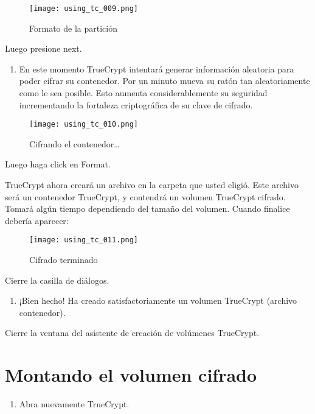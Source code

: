 \documentclass[10pt,a5paper,twoside,,]{book}
\providecommand{\tightlist}{%
  \setlength{\itemsep}{0pt}\setlength{\parskip}{0pt}}
\begin{document}
\begin{figure}[htbp]
\centering
\texttt{[image: using\_tc\_009.png]}
\caption{Formato de la partición}
\end{figure}

Luego presione next.

\begin{enumerate}
\def\labelenumi{\arabic{enumi}.}
\setcounter{enumi}{10}
\tightlist
\item
  En este momento TrueCrypt intentará generar información aleatoria para
  poder cifrar su contenedor. Por un minuto mueva su ratón tan
  aleatoriamente como le sea posible. Esto aumenta considerablemente su
  seguridad incrementando la fortaleza criptográfica de su clave de
  cifrado.
\end{enumerate}

\begin{figure}[htbp]
\centering
\texttt{[image: using\_tc\_010.png]}
\caption{Cifrando el contenedor\ldots{}}
\end{figure}

Luego haga click en Format.

TrueCrypt ahora creará un archivo en la carpeta que usted eligió. Este
archivo será un contenedor TrueCrypt, y contendrá un volumen TrueCrypt
cifrado. Tomará algún tiempo dependiendo del tamaño del volumen. Cuando
finalice debería aparecer:

\begin{figure}[htbp]
\centering
\texttt{[image: using\_tc\_011.png]}
\caption{Cifrado terminado}
\end{figure}

Cierre la casilla de diálogos.

\begin{enumerate}
\def\labelenumi{\arabic{enumi}.}
\setcounter{enumi}{11}
\tightlist
\item
  ¡Bien hecho! Ha creado satisfactoriamente un volumen TrueCrypt
  (archivo contenedor).
\end{enumerate}

Cierre la ventana del asistente de creación de volúmenes TrueCrypt.

\section{Montando el volumen cifrado}\label{montando-el-volumen-cifrado}

\begin{enumerate}
\def\labelenumi{\arabic{enumi}.}
\tightlist
\item
  Abra nuevamente TrueCrypt.
\end{enumerate}
\end{document}
